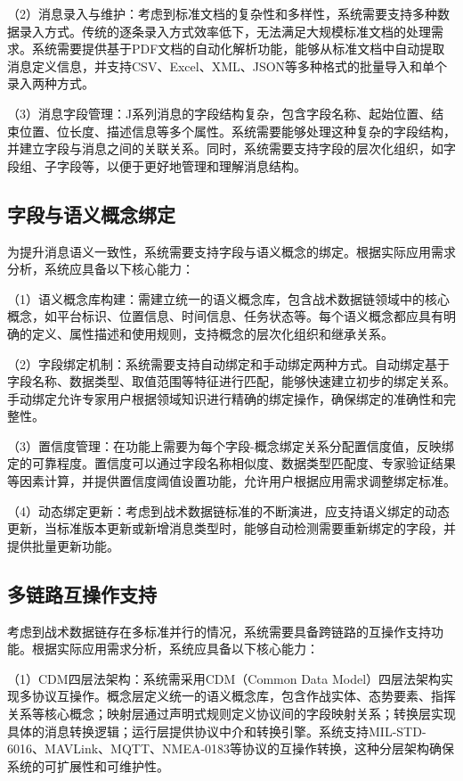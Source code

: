 （2）消息录入与维护：考虑到标准文档的复杂性和多样性，系统需要支持多种数据录入方式。传统的逐条录入方式效率低下，无法满足大规模标准文档的处理需求。系统需要提供基于PDF文档的自动化解析功能，能够从标准文档中自动提取消息定义信息，并支持CSV、Excel、XML、JSON等多种格式的批量导入和单个录入两种方式。

（3）消息字段管理：J系列消息的字段结构复杂，包含字段名称、起始位置、结束位置、位长度、描述信息等多个属性。系统需要能够处理这种复杂的字段结构，并建立字段与消息之间的关联关系。同时，系统需要支持字段的层次化组织，如字段组、子字段等，以便于更好地管理和理解消息结构。


\subsection{字段与语义概念绑定}
为提升消息语义一致性，系统需要支持字段与语义概念的绑定\cite{Chelton_Link16_Antennas_2022}。根据实际应用需求分析，系统应具备以下核心能力：

（1）语义概念库构建：需建立统一的语义概念库，包含战术数据链领域中的核心概念，如平台标识、位置信息、时间信息、任务状态等。每个语义概念都应具有明确的定义、属性描述和使用规则，支持概念的层次化组织和继承关系。

（2）字段绑定机制：系统需要支持自动绑定和手动绑定两种方式。自动绑定基于字段名称、数据类型、取值范围等特征进行匹配，能够快速建立初步的绑定关系。手动绑定允许专家用户根据领域知识进行精确的绑定操作，确保绑定的准确性和完整性。

（3）置信度管理：在功能上需要为每个字段-概念绑定关系分配置信度值，反映绑定的可靠程度。置信度可以通过字段名称相似度、数据类型匹配度、专家验证结果等因素计算，并提供置信度阈值设置功能，允许用户根据应用需求调整绑定标准。

（4）动态绑定更新：考虑到战术数据链标准的不断演进，应支持语义绑定的动态更新，当标准版本更新或新增消息类型时，能够自动检测需要重新绑定的字段，并提供批量更新功能。

\subsection{多链路互操作支持}
考虑到战术数据链存在多标准并行的情况，系统需要具备跨链路的互操作支持功能\cite{AFCEA_Link16_Improvements_2022}。根据实际应用需求分析，系统应具备以下核心能力：

（1）CDM四层法架构：系统需采用CDM（Common Data Model）四层法架构实现多协议互操作。概念层定义统一的语义概念库，包含作战实体、态势要素、指挥关系等核心概念；映射层通过声明式规则定义协议间的字段映射关系；转换层实现具体的消息转换逻辑；运行层提供协议中介和转换引擎。系统支持MIL-STD-6016、MAVLink、MQTT、NMEA-0183等协议的互操作转换，这种分层架构确保系统的可扩展性和可维护性。

